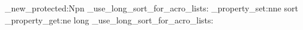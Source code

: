 % 


\newcommand\CTUacrolistbacklink{%
	\stepcounter{CTUacrolink}%
	\Acrobatmenu{GoBack}{%
		\begin{ocg}[printocg=never]{CTU acro backlink}{ctu-acro-backlink-\arabic{CTUacrolink}}{1}%
			\texttt{\CTUacrobacklink}%
		\end{ocg}}}
\newcommand\CTUacrolisthead{%
	\multicolumn{2}{@{}l@{}}{\CTUacrolistbacklink}\\}

\ExplSyntaxOn
\cs_new_protected:Npn \CTU_use_long_sort_for_acro_lists:
	{
		\acronymsmapTF
			{
				\acro_property_set:nne {\AcronymID} {sort}
					{\acro_property_get:ne {\AcronymID} {long}}
			}
			{}
			{}
	}
\NewDocumentCommand{\CTUuseLongSortForAcronyms}{}
	{\CTU_use_long_sort_for_acro_lists:}
\ExplSyntaxOff


